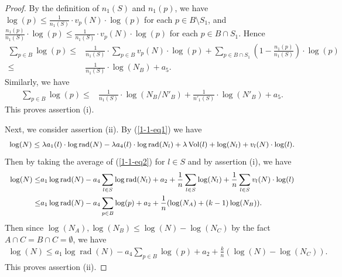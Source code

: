 \documentclass[a4paper, 12pt]{article}
\DeclareMathOperator{\rad}{\text{rad}}
\DeclareMathOperator{\Vol}{\text{Vol}}
\numberwithin{equation}{section}
\theoremstyle{definition}
\begin{document}
\begin{proof}
By the definition of $n_1(S)$ and $n_1(p)$, we have $\log(p) \le \frac{1}{n_1(S)}\cdot v_p(N)\cdot\log(p)$ for each $p\in B\setminus S_1$, and $\frac{n_1(p)}{n_1(S)} \cdot \log(p) \le \frac{1}{n_1(S)}\cdot v_p(N)\cdot\log(p)$ for each $p\in B\cap S_1$. Hence
\small\begin{align*}
\sum_{p\in B} \log(p) \le & \frac{1}{n_1(S)} \cdot \sum_{p\in B} v_p(N)\cdot\log(p) + \sum_{p\in B\cap S_1}  (1-\frac{n_1(p)}{n_1(S)})\cdot\log(p)
 \\ \le & \frac{1}{n_1(S)} \cdot \log(N_B) + a_5 .
\end{align*}\normalsize
Similarly, we have
\small\begin{align*}
\sum_{p\in B} \log(p)   \le & \frac{1}{n_1(S)} \cdot \log(N_B/N'_B) + \frac{1}{n'_1(S)} \cdot \log(N'_B) + a_5 .
\end{align*}\normalsize
This proves assertion (i).

Next, we consider assertion (ii). 
By  (\ref{1-1-eq1}) we have 
\begin{equation} \small
\begin{aligned} \label{1-1-eq2}
\log(N) \le \lambda a_1(l)\cdot \log\rad(N) - \lambda a_4(l) \cdot \log\rad(N_l)  
 + \lambda \Vol(l)  + \log(N_l) + v_l(N) \cdot \log(l) .
\end{aligned}
\end{equation}
Then by taking the average of (\ref{1-1-eq2}) for $l\in S$ and by assertion (i), we have
\begin{equation*} \small
\begin{aligned} 
\log(N) \le &  a_1 \log\rad(N) - a_4  \sum_{l\in S}\log\rad(N_l)  + a_2 
+ \frac{1}{n}\sum_{l\in S}\log(N_l)  + \frac{1}{n}\sum_{l\in S} v_l(N) \cdot \log(l) 
\\ \le &  a_1 \log\rad(N) - a_4  \sum_{p\in B}\log(p)  + a_2 + \frac{1}{n}(\log(N_A)+(k-1)\log(N_B) ).
\end{aligned}
\end{equation*}
Then since $\log(N_A), \log(N_B) \le \log(N) - \log(N_C)$ by the fact $A\cap C = B \cap C =\emptyset$, we have 
\small\begin{align*}
   \log(N) \le a_1 \log\rad(N) - a_4  \sum_{p\in B}\log(p) + a_2 + \frac{k}{n}(\log(N) - \log(N_C)).
\end{align*}\normalsize
This proves assertion (ii).


\end{proof}
\end{document}
